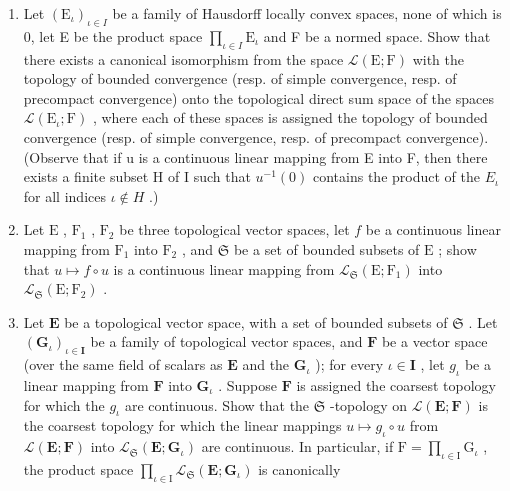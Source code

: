 \begin{enumerate}
\def\labelenumi{\arabic{enumi})}
\setcounter{enumi}{5}
\item
  Let \((\mathrm{E}_{\iota})_{\iota \in I}\) be a family of Hausdorff locally convex spaces, none of which is 0, let E be the product space \(\prod_{\iota \in I} \mathrm{E}_{\iota}\) and F be a normed space. Show that there exists a canonical isomorphism from the space \(\mathcal{L}(\mathrm{E};\mathrm{F})\) with the topology of bounded convergence (resp. of simple convergence, resp. of precompact convergence) onto the topological direct sum space of the spaces \(\mathcal{L}(\mathrm{E}_{\iota};\mathrm{F})\) , where each of these spaces is assigned the topology of bounded convergence (resp. of simple convergence, resp. of precompact convergence). (Observe that if u is a continuous linear mapping from E into F, then there exists a finite subset H of I such that \(u^{-1}(0)\) contains the product of the \(E_{\iota}\) for all indices \(\iota\notin H\) .)
\item
  Let \(\mathrm{E}\) , \(\mathrm{F}_1\) , \(\mathrm{F}_2\) be three topological vector spaces, let \(f\) be a continuous linear mapping from \(\mathrm{F}_1\) into \(\mathrm{F}_2\) , and \(\mathfrak{S}\) be a set of bounded subsets of \(\mathrm{E}\) ; show that \(u \mapsto f \circ u\) is a continuous linear mapping from \(\mathcal{L}_{\mathfrak{S}}(\mathrm{E};\mathrm{F}_1)\) into \(\mathcal{L}_{\mathfrak{S}}(\mathrm{E};\mathrm{F}_2)\) .
\item
  Let \(\mathbf{E}\) be a topological vector space, with a set of bounded subsets of \(\mathfrak{S}\) . Let \((\mathbf{G}_{\iota})_{\iota \in \mathbf{I}}\) be a family of topological vector spaces, and \(\mathbf{F}\) be a vector space (over the same field of scalars as \(\mathbf{E}\) and the \(\mathbf{G}_{\iota}\) ); for every \(\iota \in \mathbf{I}\) , let \(g_{\iota}\) be a linear mapping from \(\mathbf{F}\) into \(\mathbf{G}_{\iota}\) . Suppose \(\mathbf{F}\) is assigned the coarsest topology for which the \(g_{\iota}\) are continuous. Show that the \(\mathfrak{S}\) -topology on \(\mathcal{L}(\mathbf{E};\mathbf{F})\) is the coarsest topology for which the linear mappings \(u\mapsto g_{\iota}\circ u\) from \(\mathcal{L}(\mathbf{E};\mathbf{F})\) into \(\mathcal{L}_{\mathfrak{S}}(\mathbf{E};\mathbf{G}_{\iota})\) are continuous. In particular, if \(\mathrm{F} = \prod_{\iota \in \mathrm{I}}\mathrm{G}_{\iota}\) , the product space \(\prod_{\iota \in \mathrm{I}}\mathcal{L}_{\mathfrak{S}}(\mathbf{E};\mathbf{G}_{\iota})\) is canonically
\end{enumerate}

